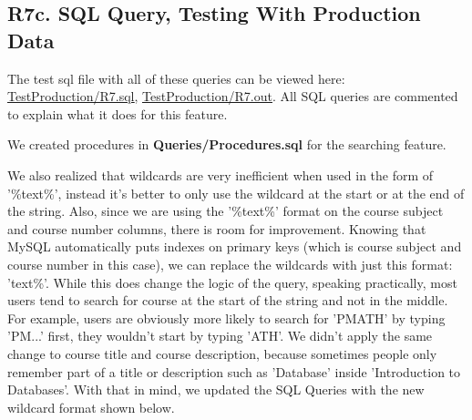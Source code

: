 \documentclass[12pt, a4paper]{article}
\begin{document}
\subsection*{R7c. SQL Query, Testing With Production Data}
The test sql file with all of these queries can be viewed here: \underline{\href{https://github.com/Kggupta/DegreeMap/tree/main/Database/Queries/TestProduction}{TestProduction/R7.sql}}, \underline{\href{https://github.com/Kggupta/DegreeMap/tree/main/Database/Queries/TestProduction}{TestProduction/R7.out}}. All SQL queries are commented to explain what it does for this feature.

We created  procedures in \textbf{Queries/Procedures.sql} for the searching feature.

We also realized that wildcards are very inefficient when used in the form of '\%text\%', instead it's better to only use the wildcard at the start or at the end of the string. Also, since we are using the '\%text\%' format on the course subject and course number columns, there is room for improvement. Knowing that MySQL automatically puts indexes on primary keys (which is course subject and course number in this case), we can replace the wildcards with just this format: 'text\%'. While this does change the logic of the query, speaking practically, most users tend to search for course at the start of the string and not in the middle. For example, users are obviously more likely to search for 'PMATH' by typing 'PM...' first, they wouldn't start by typing 'ATH'. We didn't apply the same change to course title and course description, because sometimes people only remember part of a title or description such as 'Database' inside 'Introduction to Databases'. With that in mind, we updated the SQL Queries with the new wildcard format shown below. 
\end{document}
